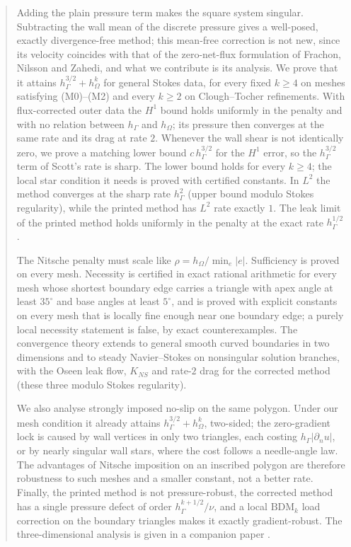 \documentclass[11pt,reqno]{amsart}
\theoremstyle{plain}
\theoremstyle{definition}
\begin{document}
\begin{abstract}
Adding the plain pressure term makes the square system singular. Subtracting the wall mean of the discrete pressure gives a well-posed, exactly divergence-free method; this mean-free correction is not new, since its velocity coincides with that of the zero-net-flux formulation of Frachon, Nilsson and Zahedi, and what we contribute is its analysis. We prove that it attains $h_\Gamma^{3/2}+h_\Omega^k$ for general Stokes data, for every fixed $k\ge4$ on meshes satisfying (M0)--(M2) and every $k\ge2$ on Clough--Tocher refinements. With flux-corrected outer data the $H^1$ bound holds uniformly in the penalty and with no relation between $h_\Gamma$ and $h_\Omega$; its pressure then converges at the same rate and its drag at rate $2$. Whenever the wall shear is not identically zero, we prove a matching lower bound $c\,h_\Gamma^{3/2}$ for the $H^1$ error, so the $h_\Gamma^{3/2}$ term of Scott's rate is sharp. The lower bound holds for every $k\ge4$; the local star condition it needs is proved with certified constants. In $L^2$ the method converges at the sharp rate $h_\Gamma^2$ (upper bound modulo Stokes regularity), while the printed method has $L^2$ rate exactly $1$. The leak limit of the printed method holds uniformly in the penalty at the exact rate $h_\Gamma^{1/2}$.

The Nitsche penalty must scale like $\rho=h_\Omega/\min_e|e|$. Sufficiency is proved on every mesh. Necessity is certified in exact rational arithmetic for every mesh whose shortest boundary edge carries a triangle with apex angle at least $35^\circ$ and base angles at least $5^\circ$, and is proved with explicit constants on every mesh that is locally fine enough near one boundary edge; a purely local necessity statement is false, by exact counterexamples. The convergence theory extends to general smooth curved boundaries in two dimensions and to steady Navier--Stokes on nonsingular solution branches, with the Oseen leak flow, $K_{NS}$ and rate-$2$ drag for the corrected method (these three modulo Stokes regularity).

We also analyse strongly imposed no-slip on the same polygon. Under our mesh condition it already attains $h_\Gamma^{3/2}+h_\Omega^k$, two-sided; the zero-gradient lock is caused by wall vertices in only two triangles, each costing $h_\Gamma|\partial_nu|$, or by nearly singular wall stars, where the cost follows a needle-angle law. The advantages of Nitsche imposition on an inscribed polygon are therefore robustness to such meshes and a smaller constant, not a better rate. Finally, the printed method is not pressure-robust, the corrected method has a single pressure defect of order $h_\Gamma^{k+1/2}/\nu$, and a local $\mathrm{BDM}_k$ load correction on the boundary triangles makes it exactly gradient-robust. The three-dimensional analysis is given in a companion paper \cite{PadhiThreeD}.


\end{abstract}
\end{document}
